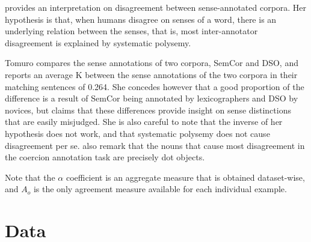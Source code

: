 \documentclass[11pt,a4paper]{article}
\begin{document}
\cite{Tomuro2001a} provides an interpretation on disagreement between sense-annotated corpora. Her hypothesis is that, when humans disagree on senses of a word, there is an underlying relation between the senses, that is, most inter-annotator disagreement is explained by systematic polysemy. 

Tomuro compares the sense annotations of two corpora, SemCor and DSO, and reports an average K between the sense annotations of the two corpora in their matching sentences of 0.264. She concedes however that a good proportion of the difference is a result of SemCor being annotated by lexicographers and DSO by novices, but claims that these differences provide insight on sense distinctions that are easily misjudged. She is also careful to note that the inverse of her hypothesis does not work, and that systematic polysemy does not cause disagreement per se.  \cite{Jezek2010} also remark that the nouns that cause most disagreement in the coercion annotation task are precisely dot objects.

Note that the $\alpha$ coefficient is an aggregate measure that is obtained dataset-wise, and $A_o$ is the only agreement measure available for each individual example.

\section{Data}
\end{document}
